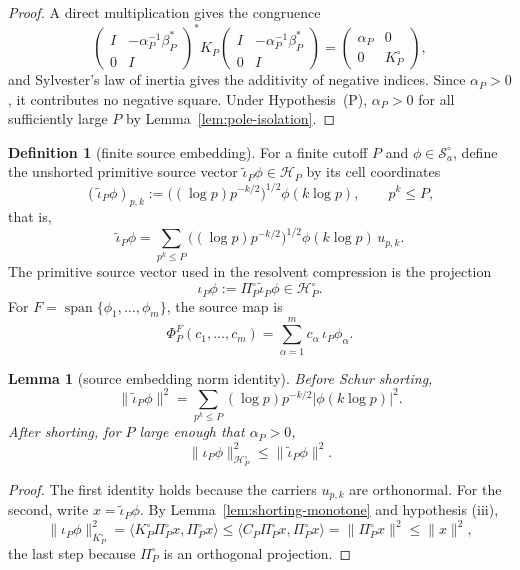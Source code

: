 \documentclass[11pt]{amsart}
\newtheorem{lemma}[theorem]{Lemma}
\theoremstyle{definition}
\newtheorem{definition}[theorem]{Definition}
\theoremstyle{remark}
\theoremstyle{definition}
\newcommand{\cH}{\mathcal{H}}
\newcommand{\cS}{\mathcal{S}}
\begin{document}
\begin{proof}
A direct multiplication gives the congruence
\[
   \begin{pmatrix}I&-\alpha_P^{-1}\beta_P^*\\0&I\end{pmatrix}^*
   K_P
   \begin{pmatrix}I&-\alpha_P^{-1}\beta_P^*\\0&I\end{pmatrix}
   =
   \begin{pmatrix}\alpha_P&0\\0&K_P^\circ\end{pmatrix},
\]
and Sylvester's law of inertia \cite{HornJohnson} gives the additivity of negative indices.  Since
$\alpha_P>0$, it contributes no negative square.  Under Hypothesis~(P), $\alpha_P>0$ for all
sufficiently large $P$ by Lemma~\ref{lem:pole-isolation}.
\end{proof}

\begin{definition}[finite source embedding]\label{def:source-embedding}
For a finite cutoff $P$ and $\phi\in\cS_a^\circ$, define the unshorted primitive source vector
$\widetilde\iota_P\phi\in\cH_P$ by its cell coordinates
\[
   (\widetilde\iota_P\phi)_{p,k}
   :=
   \bigl((\log p)p^{-k/2}\bigr)^{1/2}\phi(k\log p),
   \qquad p^k\le P,
\]
that is,
\[
   \widetilde\iota_P\phi
   =
   \sum_{p^k\le P}
   \bigl((\log p)p^{-k/2}\bigr)^{1/2}\phi(k\log p)\,u_{p,k}.
\]
The primitive source vector used in the resolvent compression is the projection
\[
   \iota_P\phi:=\Pi_P^\circ \widetilde\iota_P\phi\in\cH_P^\circ.
\]
For $F=\operatorname{span}\{\phi_1,\ldots,\phi_m\}$, the source map is
\[
   \Phi_P^F(c_1,\ldots,c_m)=\sum_{\alpha=1}^m c_\alpha\,\iota_P\phi_\alpha.
\]
\end{definition}

\begin{lemma}[source embedding norm identity]\label{lem:source-embedding-norm}
Before Schur shorting,
\[
   \|\widetilde\iota_P\phi\|^2
   =
   \sum_{p^k\le P}(\log p)p^{-k/2}|\phi(k\log p)|^2.
\]
After shorting, for $P$ large enough that $\alpha_P>0$,
\[
   \|\iota_P\phi\|_{\cH_P^\circ}^2
   \le
   \|\widetilde\iota_P\phi\|^2.
\]
\end{lemma}

\begin{proof}
The first identity holds because the carriers $u_{p,k}$ are orthonormal.  For the second, write
$x=\widetilde\iota_P\phi$.  By Lemma~\ref{lem:shorting-monotone} and hypothesis \textnormal{(iii)},
\[
   \|\iota_P\phi\|_{K_P^\circ}^2
   =\langle K_P^\circ\Pi^\circ_P x,\Pi^\circ_P x\rangle
   \le\langle C_P\Pi^\circ_P x,\Pi^\circ_P x\rangle
   =\|\Pi^\circ_P x\|^2
   \le\|x\|^2,
\]
the last step because $\Pi_P^\circ$ is an orthogonal projection.
\end{proof}
\end{document}
